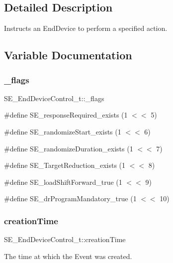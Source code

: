 \subsection{Detailed Description}
Instructs an End\+Device to perform a specified action. 

\subsection{Variable Documentation}
\mbox{\label{group__EndDeviceControl_gac4952ef023e53ea6f68563ea53149671}} 
\subsubsection{\texorpdfstring{\+\_\+flags}{\_flags}}
{\footnotesize\ttfamily S\+E\+\_\+\+End\+Device\+Control\+\_\+t\+::\+\_\+flags}

\#define S\+E\+\_\+response\+Required\+\_\+exists (1 $<$$<$ 5)

\#define S\+E\+\_\+randomize\+Start\+\_\+exists (1 $<$$<$ 6)

\#define S\+E\+\_\+randomize\+Duration\+\_\+exists (1 $<$$<$ 7)

\#define S\+E\+\_\+\+Target\+Reduction\+\_\+exists (1 $<$$<$ 8)

\#define S\+E\+\_\+load\+Shift\+Forward\+\_\+true (1 $<$$<$ 9)

\#define S\+E\+\_\+dr\+Program\+Mandatory\+\_\+true (1 $<$$<$ 10) \mbox{\label{group__EndDeviceControl_gaa9ee3d8e5ffcd87c3f77dd32d5ebc277}} 
\subsubsection{\texorpdfstring{creation\+Time}{creationTime}}
{\footnotesize\ttfamily S\+E\+\_\+\+End\+Device\+Control\+\_\+t\+::creation\+Time}

The time at which the Event was created. \mbox{\label{group__EndDeviceControl_ga545de4dad199d065df2673eaa0160606}} 
